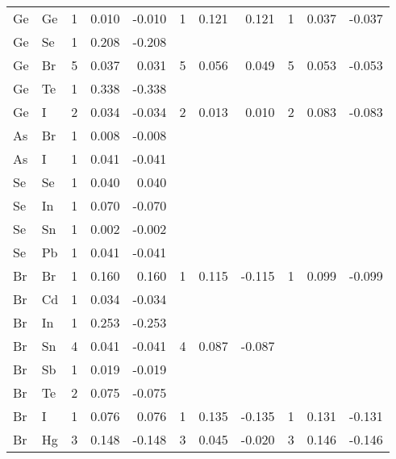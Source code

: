 \begin{table}
\begin{center}
\begin{tabular}{llrrrrrrrrr}
 Ge &  Ge &   1 &    0.010 &   -0.010 &   1 &    0.121 &    0.121 &   1 &    0.037 &   -0.037 \\
 Ge &  Se &   1 &    0.208 &   -0.208 &     &          &          &     &          &          \\
 Ge &  Br &   5 &    0.037 &    0.031 &   5 &    0.056 &    0.049 &   5 &    0.053 &   -0.053 \\
 Ge &  Te &   1 &    0.338 &   -0.338 &     &          &          &     &          &          \\
 Ge &   I &   2 &    0.034 &   -0.034 &   2 &    0.013 &    0.010 &   2 &    0.083 &   -0.083 \\
 As &  Br &   1 &    0.008 &   -0.008 &     &          &          &     &          &          \\
 As &   I &   1 &    0.041 &   -0.041 &     &          &          &     &          &          \\
 Se &  Se &   1 &    0.040 &    0.040 &     &          &          &     &          &          \\
 Se &  In &   1 &    0.070 &   -0.070 &     &          &          &     &          &          \\
 Se &  Sn &   1 &    0.002 &   -0.002 &     &          &          &     &          &          \\
 Se &  Pb &   1 &    0.041 &   -0.041 &     &          &          &     &          &          \\
 Br &  Br &   1 &    0.160 &    0.160 &   1 &    0.115 &   -0.115 &   1 &    0.099 &   -0.099 \\
 Br &  Cd &   1 &    0.034 &   -0.034 &     &          &          &     &          &          \\
 Br &  In &   1 &    0.253 &   -0.253 &     &          &          &     &          &          \\
 Br &  Sn &   4 &    0.041 &   -0.041 &   4 &    0.087 &   -0.087 &     &          &          \\
 Br &  Sb &   1 &    0.019 &   -0.019 &     &          &          &     &          &          \\
 Br &  Te &   2 &    0.075 &   -0.075 &     &          &          &     &          &          \\
 Br &   I &   1 &    0.076 &    0.076 &   1 &    0.135 &   -0.135 &   1 &    0.131 &   -0.131 \\
 Br &  Hg &   3 &    0.148 &   -0.148 &   3 &    0.045 &   -0.020 &   3 &    0.146 &   -0.146 \\

\end{tabular}
\end{center}
\end{table}
